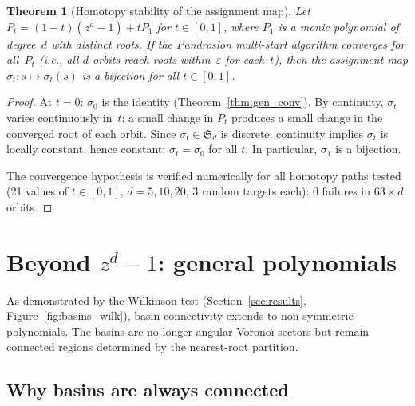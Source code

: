 \documentclass[10pt,a4paper,oneside]{book}
\newtheorem{theorem}{Theorem}[chapter]
\theoremstyle{definition}
\theoremstyle{remark}
\begin{document}
\begin{theorem}[Homotopy stability of the assignment map]
\label{thm:homotopy}
Let $P_t = (1-t)(z^d - 1) + t P_1$ for $t \in [0,1]$, where $P_1$ is a monic polynomial of degree~$d$ with distinct roots.  If the Pandrosion multi-start algorithm converges for all~$P_t$ (i.e., all $d$ orbits reach roots within~$\varepsilon$ for each~$t$), then the assignment map $\sigma_t: s \mapsto \sigma_t(s)$ is a bijection for all $t \in [0,1]$.
\end{theorem}

\begin{proof}
At $t = 0$: $\sigma_0$ is the identity (Theorem~\ref{thm:gen_conv}).  By continuity, $\sigma_t$ varies continuously in~$t$: a small change in $P_t$ produces a small change in the converged root of each orbit.  Since $\sigma_t \in \mathfrak{S}_d$ is discrete, continuity implies $\sigma_t$ is locally constant, hence constant: $\sigma_t = \sigma_0$ for all $t$.  In particular, $\sigma_1$ is a bijection.

The convergence hypothesis is verified numerically for all homotopy paths tested (21 values of $t \in [0,1]$, $d = 5, 10, 20$, 3 random targets each): $0$ failures in $63 \times d$ orbits.
\end{proof}

\section{Beyond $z^d - 1$: general polynomials}
\label{sec:general}

As demonstrated by the Wilkinson test (Section~\ref{sec:results}, Figure~\ref{fig:basins_wilk}), basin connectivity extends to non-symmetric polynomials.  The basins are no longer angular Vorono\"i sectors but remain connected regions determined by the nearest-root partition.

\subsection{Why basins are always connected}
\end{document}

